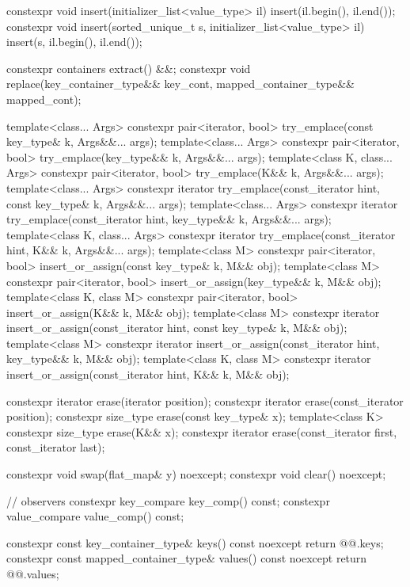 \begin{codeblock}
{{    constexpr void insert(initializer_list<value_type> il)
      { insert(il.begin(), il.end()); }
    constexpr void insert(sorted_unique_t s, initializer_list<value_type> il)
      { insert(s, il.begin(), il.end()); }

    constexpr containers extract() &&;
    constexpr void replace(key_container_type&& key_cont, mapped_container_type&& mapped_cont);

    template<class... Args>
      constexpr pair<iterator, bool> try_emplace(const key_type& k, Args&&... args);
    template<class... Args>
      constexpr pair<iterator, bool> try_emplace(key_type&& k, Args&&... args);
    template<class K, class... Args>
      constexpr pair<iterator, bool> try_emplace(K&& k, Args&&... args);
    template<class... Args>
      constexpr iterator try_emplace(const_iterator hint, const key_type& k, Args&&... args);
    template<class... Args>
      constexpr iterator try_emplace(const_iterator hint, key_type&& k, Args&&... args);
    template<class K, class... Args>
      constexpr iterator try_emplace(const_iterator hint, K&& k, Args&&... args);
    template<class M>
      constexpr pair<iterator, bool> insert_or_assign(const key_type& k, M&& obj);
    template<class M>
      constexpr pair<iterator, bool> insert_or_assign(key_type&& k, M&& obj);
    template<class K, class M>
      constexpr pair<iterator, bool> insert_or_assign(K&& k, M&& obj);
    template<class M>
      constexpr iterator insert_or_assign(const_iterator hint, const key_type& k, M&& obj);
    template<class M>
      constexpr iterator insert_or_assign(const_iterator hint, key_type&& k, M&& obj);
    template<class K, class M>
      constexpr iterator insert_or_assign(const_iterator hint, K&& k, M&& obj);

    constexpr iterator erase(iterator position);
    constexpr iterator erase(const_iterator position);
    constexpr size_type erase(const key_type& x);
    template<class K> constexpr size_type erase(K&& x);
    constexpr iterator erase(const_iterator first, const_iterator last);

    constexpr void swap(flat_map& y) noexcept;
    constexpr void clear() noexcept;

    // observers
    constexpr key_compare key_comp() const;
    constexpr value_compare value_comp() const;

    constexpr const key_container_type& keys() const noexcept      { return @@.keys; }
    constexpr const mapped_container_type& values() const noexcept { return @@.values; }

}}
\end{codeblock}
